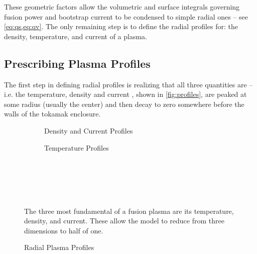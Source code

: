 These geometric factors allow the volumetric and surface integrals governing fusion power and bootstrap current to be condensed to simple radial ones -- see \cref{eq:qs,eq:qv}. The only remaining step is to define the radial profiles for: the density, temperature, and current of a plasma.

\subsection{Prescribing Plasma Profiles}

The first step in defining radial profiles is realizing that all three quantities are  -- i.e. the temperature, density and current , shown in \cref{fig:profiles}, are peaked at some radius (usually the center) and then decay to zero somewhere before the walls of the tokamak enclosure.


\begin{figure*}
	\label{fig:profiles}
    \centering
    \hfill 
    \begin{subfigure}[t]{0.45\textwidth}
        \centering
		\begin{adjustbox}{width=\textwidth}
			\Large
			
		\end{adjustbox}
        \caption{Density and Current Profiles}
    \end{subfigure}
    \hfill
    \begin{subfigure}[t]{0.45\textwidth}
        \centering
		\begin{adjustbox}{width=\textwidth}
			\Large
			
		\end{adjustbox}
        \caption{Temperature Profiles}
    \end{subfigure}
    \hfill \hfill ~\\ ~\\ ~\\
    \caption{Radial Plasma Profiles} ~\\
    \small The three most fundamental  of a fusion plasma are its temperature, density, and current. These  allow the model to reduce from three dimensions to  half of one.
\end{figure*}

